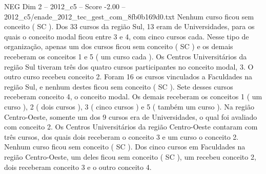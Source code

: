 \begin{textsample}{NEG Dim 2 – 2012\_c5 – Score -2.00 – 2012\_c5/enade\_2012\_tec\_gest\_com\_8fb0b169d0.txt}
Nenhum curso ficou sem conceito ( SC ).
Dos 33 cursos da região Sul, 13 eram de Universidades, para os quais o conceito modal ficou entre 3 e 4, com cinco cursos cada.
Nesse tipo de organização, apenas um dos cursos ficou sem conceito ( SC ) e os demais receberam os conceitos 1 e 5 ( um curso cada ).
Os Centros Universitários da região Sul tiveram três dos quatro cursos participantes no conceito modal, 3.
O outro curso recebeu conceito 2.
Foram 16 os cursos vinculados a Faculdades na região Sul, e nenhum destes ficou sem conceito ( SC ).
Sete desses cursos receberam conceito 4, o conceito modal.
Os demais receberam os conceitos 1 ( um curso ), 2 ( dois cursos ), 3 ( cinco cursos ) e 5 ( também um curso ).
Na região Centro-Oeste, somente um dos 9 cursos era de Universidades, o qual foi avaliado com conceito 2.
Os Centros Universitários da região Centro-Oeste contaram com três cursos, dos quais dois receberam o conceito 3 e um curso o conceito 2.
Nenhum curso ficou sem conceito ( SC ).
Dos cinco cursos em Faculdades na região Centro-Oeste, um deles ficou sem conceito ( SC ), um recebeu conceito 2, dois receberam conceito 3 e o outro conceito 4.

\end{textsample}
